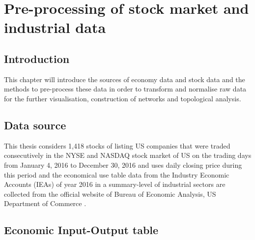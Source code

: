 \chapter[Pre-processing of data]{Pre-processing of stock market and industrial data}
\section{Introduction}
This chapter will introduce the sources of economy data and stock data and the methods to pre-process these data in order to transform and normalise raw data for the further visualisation, construction of networks and topological analysis.

\section{Data source}
This thesis considers 1,418 stocks of listing US companies that were traded consecutively in the NYSE and NASDAQ stock market of US on the trading days from January 4, 2016 to December 30, 2016 and uses daily closing price during this period and the economical use table data from the Industry Economic Accounts (IEAs) of year 2016 in a summary-level of industrial sectors are collected from the official website of Bureau of Economic Analysis, US Department of Commerce \cite{bea}.

\section{Economic Input-Output table}

